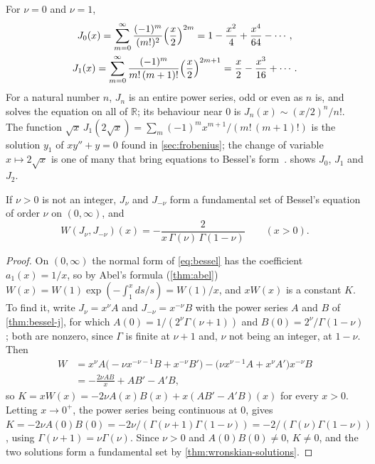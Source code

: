 For $\nu=0$ and $\nu=1$,
\begin{gather*}
J_0(x)=\sum_{m=0}^\infty\frac{(-1)^m}{(m!)^2}\Bigl(\frac x2\Bigr)^{2m}=1-\frac{x^2}4+\frac{x^4}{64}-\cdots,\\
J_1(x)=\sum_{m=0}^\infty\frac{(-1)^m}{m!\,(m+1)!}\Bigl(\frac x2\Bigr)^{2m+1}=\frac x2-\frac{x^3}{16}+\cdots .
\end{gather*}
For a natural number $n$, $J_n$ is an entire power series, odd or even as $n$ is, and solves the equation on all of $\mathbb R$; its behaviour near $0$ is $J_n(x)\sim(x/2)^n/n!$. The function $\sqrt x\,J_1(2\sqrt x)=\sum_m(-1)^mx^{m+1}/(m!\,(m+1)!)$ is the solution $y_1$ of $xy''+y=0$ found in \cref{sec:frobenius}; the change of variable $x\mapsto2\sqrt x$ is one of many that bring equations to Bessel's form~\cite[Chap.~IV]{watson1944}.  shows $J_0$, $J_1$ and $J_2$.

\begin{theorem}
\label{thm:bessel-basis}
If $\nu>0$ is not an integer, $J_\nu$ and $J_{-\nu}$ form a fundamental set of Bessel's equation of order $\nu$ on $(0,\infty)$, and
\[
W(J_\nu,J_{-\nu})(x)=-\frac2{x\,\Gamma(\nu)\,\Gamma(1-\nu)}\qquad(x>0).
\]
\end{theorem}

\begin{proof}
On $(0,\infty)$ the normal form of \eqref{eq:bessel} has the coefficient $a_1(x)=1/x$, so by Abel's formula (\cref{thm:abel}) $W(x)=W(1)\exp(-\int_1^xds/s)=W(1)/x$, and $xW(x)$ is a constant $K$. To find it, write $J_\nu=x^\nu A$ and $J_{-\nu}=x^{-\nu}B$ with the power series $A$ and $B$ of \cref{thm:bessel-j}, for which $A(0)=1/(2^\nu\Gamma(\nu+1))$ and $B(0)=2^\nu/\Gamma(1-\nu)$; both are nonzero, since $\Gamma$ is finite at $\nu+1$ and, $\nu$ not being an integer, at $1-\nu$. Then
\begin{align*}
W&=x^\nu A\bigl(-\nu x^{-\nu-1}B+x^{-\nu}B'\bigr)-\bigl(\nu x^{\nu-1}A+x^\nu A'\bigr)x^{-\nu}B\\
&=-\frac{2\nu AB}x+AB'-A'B ,
\end{align*}
so $K=xW(x)=-2\nu A(x)B(x)+x(AB'-A'B)(x)$ for every $x>0$. Letting $x\to0^+$, the power series being continuous at $0$, gives $K=-2\nu A(0)B(0)=-2\nu/(\Gamma(\nu+1)\Gamma(1-\nu))=-2/(\Gamma(\nu)\Gamma(1-\nu))$, using $\Gamma(\nu+1)=\nu\Gamma(\nu)$. Since $\nu>0$ and $A(0)B(0)\ne0$, $K\ne0$, and the two solutions form a fundamental set by \cref{thm:wronskian-solutions}.
\end{proof}

